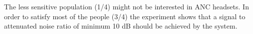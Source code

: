 The less sensitive population (1/4) might not be interested in ANC headsets. In order to satisfy most of the people (3/4) the experiment shows that a signal to attenuated noise ratio of minimum 10 dB should be achieved by the system.  





